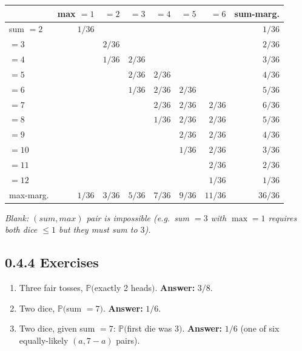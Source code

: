 \documentclass[
  10pt,
  twoside]{book}
\newcounter{none} %
\providecommand{\tightlist}{%
  \setlength{\itemsep}{0pt}\setlength{\parskip}{0pt}}
\begin{document}
{\def\LTcaptype{none} %
\begin{table}[H]
\centering
\begin{tabular}{|l|r|r|r|r|r|r|r|}
\toprule
 & max \(=1\) & \(=2\) & \(=3\) & \(=4\) & \(=5\) & \(=6\) & sum-marg. \\
\midrule



sum \(=2\) & \(1/36\) & & & & & & \(1/36\) \\
\(=3\) & & \(2/36\) & & & & & \(2/36\) \\
\(=4\) & & \(1/36\) & \(2/36\) & & & & \(3/36\) \\
\(=5\) & & & \(2/36\) & \(2/36\) & & & \(4/36\) \\
\(=6\) & & & \(1/36\) & \(2/36\) & \(2/36\) & & \(5/36\) \\
\(=7\) & & & & \(2/36\) & \(2/36\) & \(2/36\) & \(6/36\) \\
\(=8\) & & & & \(1/36\) & \(2/36\) & \(2/36\) & \(5/36\) \\
\(=9\) & & & & & \(2/36\) & \(2/36\) & \(4/36\) \\
\(=10\) & & & & & \(1/36\) & \(2/36\) & \(3/36\) \\
\(=11\) & & & & & & \(2/36\) & \(2/36\) \\
\(=12\) & & & & & & \(1/36\) & \(1/36\) \\
max-marg. & \(1/36\) & \(3/36\) & \(5/36\) & \(7/36\) & \(9/36\) &
\(11/36\) & \(36/36\) \\
\bottomrule
\end{tabular}
\end{table}
}

\emph{Blank: \((sum, max)\) pair is impossible (e.g.~sum \(=3\) with
\(\max=1\) requires both dice \(\le 1\) but they must sum to \(3\)).}

\subsection{0.4.4 Exercises}\label{exercises-3}

\begin{enumerate}
\def\labelenumi{\arabic{enumi}.}
\tightlist
\item
  Three fair tosses, \(\mathbb{P}(\)exactly 2 heads\()\).
  \textbf{Answer:} \(3/8\).
\item
  Two dice, \(\mathbb{P}(\)sum \(= 7)\). \textbf{Answer:} \(1/6\).
\item
  Two dice, given sum \(= 7\): \(\mathbb{P}(\)first die was 3\()\).
  \textbf{Answer:} \(1/6\) (one of six equally-likely \((a, 7-a)\)
  pairs).
\end{enumerate}
\end{document}

